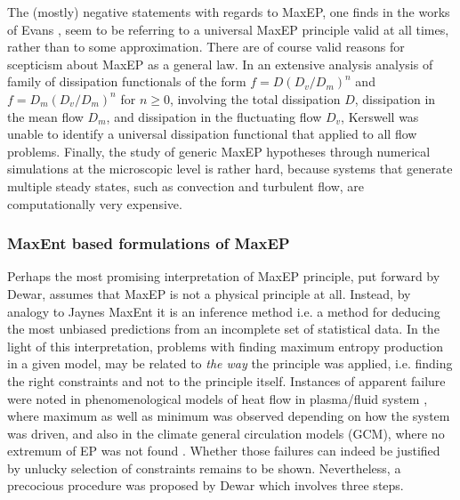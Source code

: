 \documentclass[a4paper,12pt]{article}
\begin{document}

The (mostly) negative statements with regards to MaxEP, one finds in the works of Evans \cite{Evans:2241458}, seem to be referring to a universal MaxEP principle valid at all times, rather than to some approximation.
There are of course valid reasons for scepticism about MaxEP as a general law. In an extensive analysis analysis of family of dissipation functionals of the form $f= D(D_v/D_m)^n$ and $f= D_m(D_v/D_m)^n$ for $n\geq 0$, involving the total dissipation $D$, dissipation in the mean flow $D_m$, and dissipation in the fluctuating flow $D_v$, Kerswell \cite{Kerswell:2002bw} was unable to identify a universal dissipation functional that applied to all flow problems.
Finally, the study of generic MaxEP hypotheses through numerical simulations at the microscopic level is rather hard, because systems that generate multiple steady states, such as convection and turbulent flow, are computationally very expensive.
 
\subsubsection{MaxEnt based formulations of MaxEP}

Perhaps the most promising interpretation of MaxEP principle, put forward by Dewar\cite{Dewar:775452, Dewar:2009fg, Dewar:2005eo}, assumes that MaxEP is not a physical principle at all. Instead, by analogy to Jaynes MaxEnt it is an inference method i.e. a method for deducing the most unbiased predictions from an incomplete set of statistical data. In the light of this interpretation, problems with finding maximum entropy production in a given model, may be related to \textit{the way} the principle was applied, i.e. finding the right constraints and not to the principle itself.
Instances of apparent failure were noted in phenomenological models of heat flow in plasma/fluid system \cite{Kawazura:2010dy}, where maximum as well as minimum was observed depending on how the system was driven, and also in the climate general circulation models (GCM), where no extremum of EP was not found \cite{Dewar:2014ek}.
Whether those failures can indeed be justified by unlucky selection of constraints remains to be shown. Nevertheless, a precocious procedure was proposed by Dewar which involves three steps.
\end{document}
